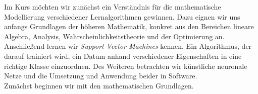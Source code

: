 Im Kurs möchten wir zunächst ein Verständnis für die mathematische Modellierung verschiedener Lernalgorithmen gewinnen. Dazu eignen wir uns anfangs Grundlagen der höheren Mathematik, konkret aus den Bereichen lineare Algebra, Analysis, Wahrscheinlichkeitstheorie und der Optimierung an. Anschließend lernen wir \emph{Support Vector Machines} kennen. Ein Algorithmus, der darauf trainiert wird, ein Datum anhand verschiedener Eigenschaften in eine richtige Klasse einzuordnen. Des Weiteren betrachten wir künstliche neuronale Netze und die Umsetzung und Anwendung beider in Software.\\
Zunächst beginnen wir mit den mathematischen Grundlagen.